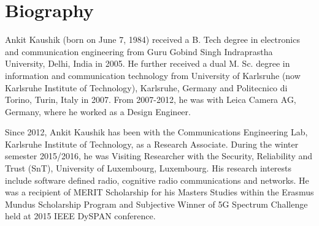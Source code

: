 \chapter*{Biography}


Ankit Kaushik (born on June 7, 1984) received a B. Tech degree in electronics and communication engineering from Guru Gobind Singh Indraprastha University, Delhi, India in 2005. He further received a dual M. Sc. degree in information and communication technology from University of Karlsruhe (now Karlsruhe Institute of Technology), Karlsruhe, Germany and Politecnico di Torino, Turin, Italy in 2007. From 2007-2012, he was with Leica Camera AG, Germany, where he worked as a Design Engineer. 

Since 2012, Ankit Kaushik has been with the Communications Engineering Lab, Karlsruhe Institute of Technology, as a Research Associate. During the winter semester 2015/2016, he was Visiting Researcher with the Security, Reliability and Trust (SnT), University of Luxembourg, Luxembourg. His research interests include software defined radio, cognitive radio communications and networks. He was a recipient of MERIT Scholarship for his Masters Studies within the Erasmus Mundus Scholarship Program and Subjective Winner of 5G Spectrum Challenge held at 2015 IEEE DySPAN conference.

%
%
%	

